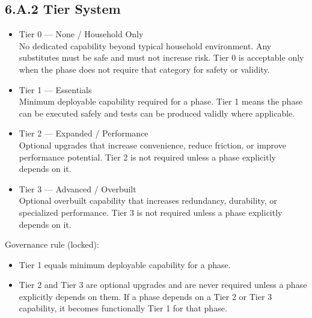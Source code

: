 \documentclass[10pt]{article}
\begin{document}
\subsection*{6.A.2 Tier System}
{}

\begin{itemize}
\item Tier 0 — None / Household Only\\
No dedicated capability beyond typical household environment. Any substitutes must be safe and must not increase risk. Tier 0 is acceptable only when the phase does not require that category for safety or validity.

\item Tier 1 — Essentials\\
Minimum deployable capability required for a phase. Tier 1 means the phase can be executed safely and tests can be produced validly where applicable.

\item Tier 2 — Expanded / Performance\\
Optional upgrades that increase convenience, reduce friction, or improve performance potential. Tier 2 is not required unless a phase explicitly depends on it.

\item Tier 3 — Advanced / Overbuilt\\
Optional overbuilt capability that increases redundancy, durability, or specialized performance. Tier 3 is not required unless a phase explicitly depends on it.
\end{itemize}

Governance rule (locked):

\begin{itemize}
\item Tier 1 equals minimum deployable capability for a phase.
\item Tier 2 and Tier 3 are optional upgrades and are never required unless a phase explicitly depends on them. If a phase depends on a Tier 2 or Tier 3 capability, it becomes functionally Tier 1 for that phase.
\end{itemize}
\end{document}
